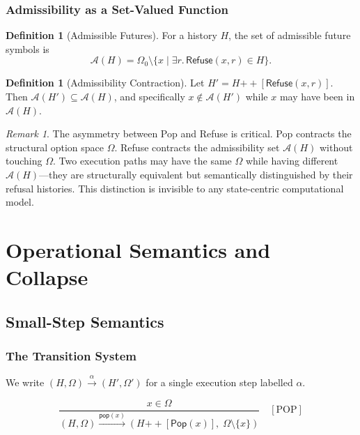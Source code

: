 \documentclass[12pt, a4paper, openany]{book}
\theoremstyle{plain}
\theoremstyle{definition}
\newtheorem{definition}[theorem]{Definition}
\theoremstyle{remark}
\newtheorem{remark}[theorem]{Remark}
\newcommand{\Pop}{\mathsf{Pop}}
\newcommand{\Refuse}{\mathsf{Refuse}}
\newcommand{\calA}{\mathcal{A}}
\begin{document}
\section{Admissibility as a Set-Valued Function}

\begin{definition}[Admissible Futures]
For a history $H$, the set of admissible future symbols is
\[
\calA(H) = \Omega_0 \setminus \{x \mid \exists r.\, \Refuse(x, r) \in H\}.
\]
\end{definition}

\begin{definition}[Admissibility Contraction]
Let $H' = H \mathbin{++} [\Refuse(x, r)]$. Then $\calA(H') \subseteq \calA(H)$,
and specifically $x \notin \calA(H')$ while $x$ may have been in $\calA(H)$.
\end{definition}

\begin{remark}
The asymmetry between Pop and Refuse is critical. Pop contracts the structural
option space $\Omega$. Refuse contracts the admissibility set $\calA(H)$ without
touching $\Omega$. Two execution paths may have the same $\Omega$ while having
different $\calA(H)$---they are structurally equivalent but semantically
distinguished by their refusal histories. This distinction is invisible to any
state-centric computational model.
\end{remark}

\part{Operational Semantics and Collapse}

\chapter{Small-Step Semantics}

\section{The Transition System}

We write $(H, \Omega) \xrightarrow{\alpha} (H', \Omega')$ for a single execution
step labelled $\alpha$.

\[
\frac{x \in \Omega}{(H, \Omega) \xrightarrow{\mathsf{pop}(x)} (H \mathbin{++} [\Pop(x)],\; \Omega \setminus \{x\})} \quad [\mathrm{POP}]
\]
\end{document}
